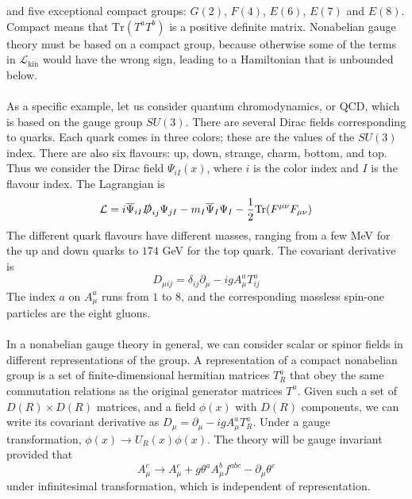 \documentclass[cyan]{elegantnote}
\begin{document}
and five exceptional compact groups: $G(2)$, $F(4)$, $E(6)$, $E(7)$ and $E(8)$. Compact means that $\mathrm{Tr}(T^aT^b)$ is a positive definite matrix. Nonabelian gauge theory must be based on a compact group, because otherwise some of the
terms in $\mathcal{L}_{\mathrm{kin}}$ would have the wrong sign, leading to a Hamiltonian that is unbounded below.
\\ \\
As a specific example, let us consider quantum chromodynamics, or QCD, which is based on the gauge group $SU(3)$. There are several Dirac fields corresponding to quarks. Each quark comes in three colors; these are the
values of the $SU(3)$ index. 
There are also six flavours: up, down, strange, charm, bottom, and top. Thus we consider the Dirac field $\Psi_{iI}(x)$, where $i$ is the color index and $I$ is the flavour index. The Lagrangian is
\[\mathcal{L} = i\overline{\Psi}_{iI}\slashed{D}_{ij}\Psi_{jI} - m_I\overline{\Psi}_{I}\Psi_{I} - \frac{1}{2}\mathrm{Tr}(F^{\mu\nu}F_{\mu\nu})\]
The different quark flavours have different masses, ranging from a few MeV for the up and down quarks to $174$ GeV for the top quark. The covariant derivative is
\[D_{\mu ij} = \delta_{ij}\partial_{\mu} - igA^a_{\mu}T^a_{ij}\]
The index $a$ on $A^a_{\mu}$ runs from $1$ to $8$, and the corresponding massless spin-one particles are the eight gluons.
\\ \\
In a nonabelian gauge theory in general, we can consider scalar or spinor fields in different representations of the group. A representation of a compact nonabelian group is a set of finite-dimensional hermitian matrices $T^a_{R}$ that obey the same commutation relations as the original generator matrices $T^a$. 
Given such a set of $D(R)\times D(R)$ matrices, and
a field $\phi(x)$ with $D(R)$ components, we can write its covariant derivative as $D_{\mu} = \partial_{\mu} -igA^a_{\mu}T^a_{R}$. 
Under a gauge transformation, $\phi(x) \to U_R(x)\phi(x)$. The theory will be gauge invariant provided that
\[A^c_{\mu} \to A^c_{\mu} + g\theta^aA^b_{\mu}f^{abc} - \partial_{\mu}\theta^c\]
under infinitesimal transformation, which is independent of representation.
\end{document}
